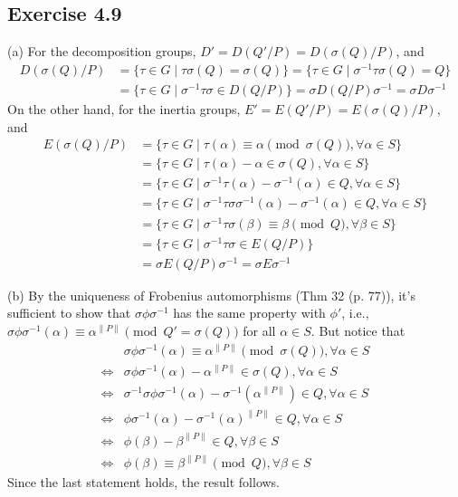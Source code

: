 \documentclass[../Marcus.tex]{subfiles}
\begin{document}

\subsection*{Exercise 4.9}

(a) For the decomposition groups, $D' = D(Q'/P) = D(\sigma(Q)/P)$, and
\begin{align*}
D(\sigma(Q)/P) & = \{\tau\in G\mid \tau\sigma(Q)=\sigma(Q)\} = \{\tau\in G\mid \sigma^{-1}\tau\sigma(Q)=Q\} \\
&= \{\tau\in G\mid \sigma^{-1}\tau\sigma \in D(Q/P)\} = \sigma D(Q/P) \sigma^{-1} = \sigma D\sigma^{-1}
\end{align*}
On the other hand, for the inertia groups, $E' = E(Q'/P) = E(\sigma(Q)/P)$, and
\begin{align*}
E(\sigma(Q)/P) &= \{\tau\in G\mid \tau(\alpha)\equiv\alpha \pmod{\sigma(Q)}, \forall\alpha\in S\} \\
&= \{\tau\in G\mid \tau(\alpha)-\alpha\in\sigma(Q), \forall\alpha\in S\} \\
&= \{\tau\in G\mid \sigma^{-1}\tau(\alpha)-\sigma^{-1}(\alpha)\in Q, \forall\alpha\in S\} \\
&= \{\tau\in G\mid \sigma^{-1}\tau\sigma\sigma^{-1}(\alpha)-\sigma^{-1}(\alpha)\in Q, \forall\alpha\in S\} \\
&= \{\tau\in G\mid \sigma^{-1}\tau\sigma(\beta) \equiv \beta \pmod{Q}, \forall\beta\in S\} \\
&= \{\tau\in G\mid \sigma^{-1}\tau\sigma\in E(Q/P)\} \\
&= \sigma E(Q/P)\sigma^{-1} = \sigma E\sigma^{-1}
\end{align*}

(b) By the uniqueness of Frobenius automorphisms (Thm 32 (p. 77)), it's sufficient to show that $\sigma\phi\sigma^{-1}$ has the same property with $\phi'$, i.e., $\sigma\phi\sigma^{-1}(\alpha)\equiv\alpha^{\|P\|} \pmod{Q'=\sigma(Q)}$ for all $\alpha\in S$. But notice that
\begin{align*}
&\sigma\phi\sigma^{-1}(\alpha)\equiv\alpha^{\|P\|} \pmod{\sigma(Q)}, \forall\alpha\in S \\
\iff{} &\sigma\phi\sigma^{-1}(\alpha)-\alpha^{\|P\|}\in\sigma(Q), \forall\alpha\in S \\
\iff{} &\sigma^{-1}\sigma\phi\sigma^{-1}(\alpha)-\sigma^{-1}(\alpha^{\|P\|}) \in Q, \forall\alpha\in S \\
\iff{} &\phi\sigma^{-1}(\alpha)-\sigma^{-1}(\alpha)^{\|P\|} \in Q, \forall\alpha\in S \\
\iff{} &\phi(\beta)-\beta^{\|P\|} \in Q, \forall\beta\in S \\
\iff{} &\phi(\beta)\equiv\beta^{\|P\|} \pmod{Q}, \forall\beta\in S
\end{align*}
Since the last statement holds, the result follows.
\end{document}
